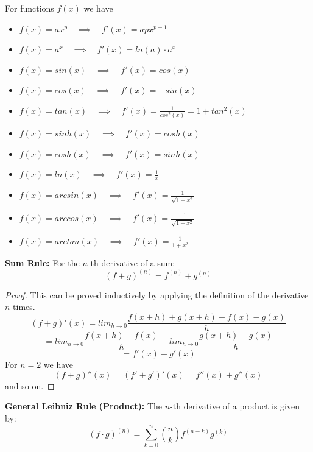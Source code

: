 \begin{theorem}
    For functions $f(x)$ we have
    \begin{itemize}
        \item $f(x) = a x^p \quad \implies \quad f'(x) = a p x^{p-1}$
        \item $f(x) = a^x \quad \implies \quad f'(x) = ln(a) \cdot a^x$
        \item $f(x) = sin(x) \quad \implies \quad f'(x) = cos(x)$
        \item $f(x) = cos(x) \quad \implies \quad f'(x) = -sin(x)$
        \item $f(x) = tan(x) \quad \implies \quad f'(x) = \frac{1}{cos^2(x)} = 1 + tan^2(x)$
        \item $f(x) = sinh(x) \quad \implies \quad f'(x) = cosh(x)$
        \item $f(x) = cosh(x) \quad \implies \quad f'(x) = sinh(x)$
        \item $f(x) = ln(x) \quad \implies \quad f'(x) = \frac{1}{x}$
        \item $f(x) = arcsin(x) \quad \implies \quad f'(x) = \frac{1}{\sqrt{1-x^2}}$
        \item $f(x) = arccos(x) \quad \implies \quad f'(x) = \frac{-1}{\sqrt{1-x^2}}$
        \item $f(x) = arctan(x) \quad \implies \quad f'(x) = \frac{1}{1+x^2}$
    \end{itemize}
\end{theorem}

\begin{theorem}
    \textbf{Sum Rule:} For the $n$-th derivative of a sum:
    $$(f + g)^{(n)} = f^{(n)} + g^{(n)} $$
\end{theorem}

\begin{proof}
    This can be proved inductively by applying the definition of the derivative $n$ times.
    $$(f+g)' (x) = lim_{h \to 0} \frac{f(x+h)+g(x+h)-f(x)-g(x)}{h}$$
    $$ = lim_{h \to 0} \frac{f(x+h)-f(x)}{h} + lim_{h \to 0} \frac{g(x+h)-g(x)}{h}$$
    $$ = f'(x) + g'(x)$$
    For $n=2$ we have
    $$(f+g)'' (x) = (f'+g')' (x) = f''(x) + g''(x)$$
    and so on.
\end{proof}

\begin{theorem}
    \textbf{General Leibniz Rule (Product):} The $n$-th derivative of a product is given by:
    $$(f \cdot g)^{(n)} = \sum_{k=0}^{n} \binom{n}{k} f^{(n-k)} g^{(k)} $$
\end{theorem}

